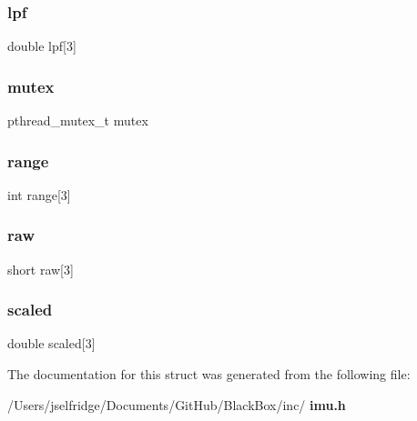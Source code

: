 \subsubsection{lpf}
{\footnotesize\ttfamily double lpf[3]}

\mbox{\label{structimu__data__struct_a4acff8232e4aec9cd5c6dc200ac55ef3}} 
\subsubsection{mutex}
{\footnotesize\ttfamily pthread\+\_\+mutex\+\_\+t mutex}

\mbox{\label{structimu__data__struct_a69fa26f636a8ccccdc4b6034342b609e}} 
\subsubsection{range}
{\footnotesize\ttfamily int range[3]}

\mbox{\label{structimu__data__struct_a133c5462bd26e3588c96919c7d02ddf2}} 
\subsubsection{raw}
{\footnotesize\ttfamily short raw[3]}

\mbox{\label{structimu__data__struct_a6b5c00b2229f55dc7d2212de803717aa}} 
\subsubsection{scaled}
{\footnotesize\ttfamily double scaled[3]}



The documentation for this struct was generated from the following file\+:\begin{DoxyCompactItemize}
\item 
/\+Users/jselfridge/\+Documents/\+Git\+Hub/\+Black\+Box/inc/\textbf{ imu.\+h}\end{DoxyCompactItemize}
